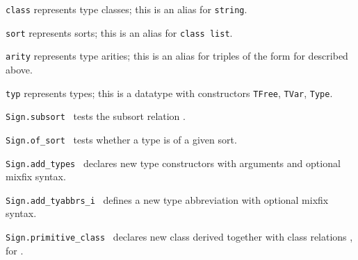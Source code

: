 \begin{isabellebody}
\begin{isamarkuptext}
\begin{description}
  \item \verb|class| represents type classes; this is an alias for
  \verb|string|.

  \item \verb|sort| represents sorts; this is an alias for
  \verb|class list|.

  \item \verb|arity| represents type arities; this is an alias for
  triples of the form  for  described above.

  \item \verb|typ| represents types; this is a datatype with
  constructors \verb|TFree|, \verb|TVar|, \verb|Type|.

  \item \verb|Sign.subsort|~
  tests the subsort relation .

  \item \verb|Sign.of_sort|~ tests whether a type
  is of a given sort.

  \item \verb|Sign.add_types|~ declares new
  type constructors  with  arguments and
  optional mixfix syntax.

  \item \verb|Sign.add_tyabbrs_i|~
  defines a new type abbreviation  with
  optional mixfix syntax.

  \item \verb|Sign.primitive_class|~ declares new class  derived together with
  class relations , for .


\end{description}
\end{isamarkuptext}
\end{isabellebody}
